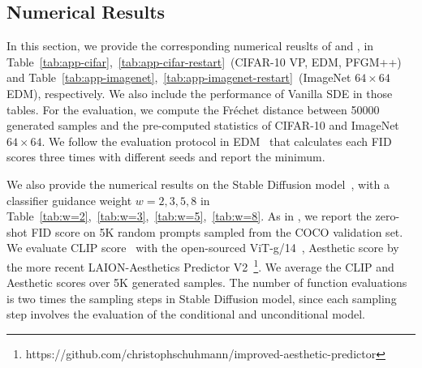 \subsection{Numerical Results}
\label{app:extra-numerical}
In this section, we provide the corresponding numerical reuslts of  and , in Table~\ref{tab:app-cifar},~\ref{tab:app-cifar-restart}~(CIFAR-10 VP, EDM, PFGM++) and Table~\ref{tab:app-imagenet},~\ref{tab:app-imagenet-restart}~(ImageNet $64\times 64$ EDM), respectively. We also include the performance of Vanilla SDE in those tables. For the evaluation, we compute the Fréchet distance between 50000 generated samples and the pre-computed statistics of CIFAR-10 and ImageNet $64\times 64$. We follow the evaluation protocol in EDM~\cite{Karras2022ElucidatingTD} that calculates each FID scores three times with different seeds and report the minimum. 

We also provide the numerical results on the Stable Diffusion model~\cite{Rombach2021HighResolutionIS}, with a classifier guidance weight $w=2,3,5,8$ in Table~\ref{tab:w=2},~\ref{tab:w=3},~\ref{tab:w=5},~\ref{tab:w=8}. As in \cite{Meng2022OnDO}, we report the zero-shot FID score on 5K random prompts sampled from the COCO validation set. We evaluate CLIP score~\cite{Hessel2021CLIPScoreAR} with the open-sourced ViT-g/14~\cite{ilharco_gabriel_2021_5143773}, Aesthetic score by the more recent LAION-Aesthetics Predictor V2~\footnote{https://github.com/christophschuhmann/improved-aesthetic-predictor}. We average the CLIP and Aesthetic scores over 5K generated samples. The number of function evaluations is two times the sampling steps in Stable Diffusion model, since each sampling step involves the evaluation of the conditional and unconditional model.


